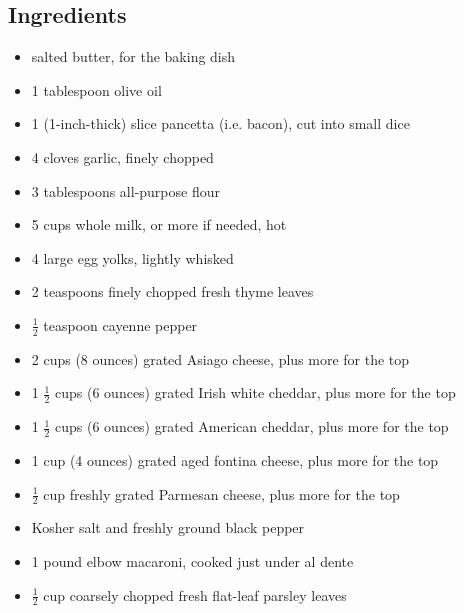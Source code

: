 \documentclass[12pt]{article}
\begin{document}
\subsection*{Ingredients}
\begin{itemize}
  \item salted butter, for the baking dish
  \item 1 tablespoon olive oil
  \item 1 (1-inch-thick) slice pancetta (i.e. bacon), cut into small dice
  \item 4 cloves garlic, finely chopped
  \item 3 tablespoons all-purpose flour
  \item 5 cups whole milk, or more if needed, hot
  \item 4 large egg yolks, lightly whisked
  \item 2 teaspoons finely chopped fresh thyme leaves
  \item $\frac{1}{2}$ teaspoon cayenne pepper
  \item 2 cups (8 ounces) grated Asiago cheese, plus more for the top
  \item 1 $\frac{1}{2}$ cups (6 ounces) grated Irish white cheddar, plus more for the top
  \item 1 $\frac{1}{2}$ cups (6 ounces) grated American cheddar, plus more for the top
  \item 1 cup (4 ounces) grated aged fontina cheese, plus more for the top
  \item $\frac{1}{2}$ cup freshly grated Parmesan cheese, plus more for the top
  \item Kosher salt and freshly ground black pepper
  \item 1 pound elbow macaroni, cooked just under al dente
  \item $\frac{1}{2}$ cup coarsely chopped fresh flat-leaf parsley leaves
\end{itemize}
\end{document}
